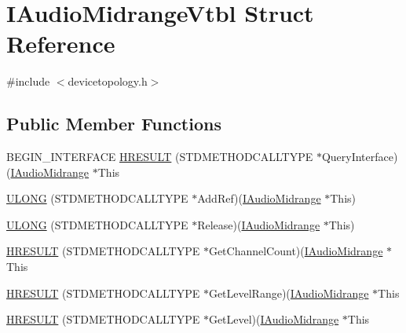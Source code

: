 \hypertarget{struct_i_audio_midrange_vtbl}{}\section{I\+Audio\+Midrange\+Vtbl Struct Reference}
\label{struct_i_audio_midrange_vtbl}


{\ttfamily \#include $<$devicetopology.\+h$>$}

\subsection*{Public Member Functions}
\begin{DoxyCompactItemize}
\item 
B\+E\+G\+I\+N\+\_\+\+I\+N\+T\+E\+R\+F\+A\+CE \hyperlink{struct_i_audio_midrange_vtbl_a9f7d438a3656008e52dae10b44a68136}{H\+R\+E\+S\+U\+LT} (S\+T\+D\+M\+E\+T\+H\+O\+D\+C\+A\+L\+L\+T\+Y\+PE $\ast$Query\+Interface)(\hyperlink{devicetopology_8h_a4da06c3982b0dfbafb61813769a9ccc7}{I\+Audio\+Midrange} $\ast$This
\item 
\hyperlink{struct_i_audio_midrange_vtbl_a4ae51feb0628f9e09c999dc37503c5d5}{U\+L\+O\+NG} (S\+T\+D\+M\+E\+T\+H\+O\+D\+C\+A\+L\+L\+T\+Y\+PE $\ast$Add\+Ref)(\hyperlink{devicetopology_8h_a4da06c3982b0dfbafb61813769a9ccc7}{I\+Audio\+Midrange} $\ast$This)
\item 
\hyperlink{struct_i_audio_midrange_vtbl_ad118787060ea6dc40329b80dc25a8ded}{U\+L\+O\+NG} (S\+T\+D\+M\+E\+T\+H\+O\+D\+C\+A\+L\+L\+T\+Y\+PE $\ast$Release)(\hyperlink{devicetopology_8h_a4da06c3982b0dfbafb61813769a9ccc7}{I\+Audio\+Midrange} $\ast$This)
\item 
\hyperlink{struct_i_audio_midrange_vtbl_abe4a74bb3ea73ec744bc779582a3a952}{H\+R\+E\+S\+U\+LT} (S\+T\+D\+M\+E\+T\+H\+O\+D\+C\+A\+L\+L\+T\+Y\+PE $\ast$Get\+Channel\+Count)(\hyperlink{devicetopology_8h_a4da06c3982b0dfbafb61813769a9ccc7}{I\+Audio\+Midrange} $\ast$This
\item 
\hyperlink{struct_i_audio_midrange_vtbl_aa7c7d0d14601f17371eeaa5e302da517}{H\+R\+E\+S\+U\+LT} (S\+T\+D\+M\+E\+T\+H\+O\+D\+C\+A\+L\+L\+T\+Y\+PE $\ast$Get\+Level\+Range)(\hyperlink{devicetopology_8h_a4da06c3982b0dfbafb61813769a9ccc7}{I\+Audio\+Midrange} $\ast$This
\item 
\hyperlink{struct_i_audio_midrange_vtbl_a008b1e8a2afc46a8a9749351d2af029b}{H\+R\+E\+S\+U\+LT} (S\+T\+D\+M\+E\+T\+H\+O\+D\+C\+A\+L\+L\+T\+Y\+PE $\ast$Get\+Level)(\hyperlink{devicetopology_8h_a4da06c3982b0dfbafb61813769a9ccc7}{I\+Audio\+Midrange} $\ast$This

\end{DoxyCompactItemize}
